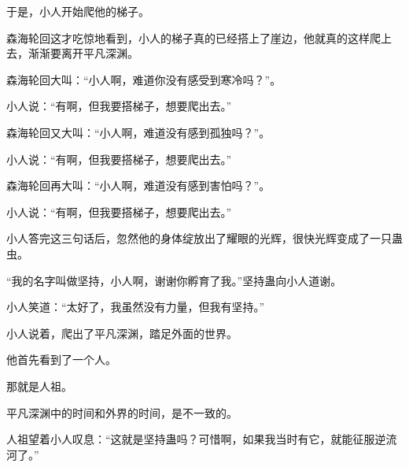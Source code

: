 \begin{this_body}
于是，小人开始爬他的梯子。

森海轮回这才吃惊地看到，小人的梯子真的已经搭上了崖边，他就真的这样爬上去，渐渐要离开平凡深渊。

森海轮回大叫：“小人啊，难道你没有感受到寒冷吗？”。

小人说：“有啊，但我要搭梯子，想要爬出去。”

森海轮回又大叫：“小人啊，难道没有感到孤独吗？”。

小人说：“有啊，但我要搭梯子，想要爬出去。”

森海轮回再大叫：“小人啊，难道没有感到害怕吗？”。

小人说：“有啊，但我要搭梯子，想要爬出去。”

小人答完这三句话后，忽然他的身体绽放出了耀眼的光辉，很快光辉变成了一只蛊虫。

“我的名字叫做坚持，小人啊，谢谢你孵育了我。”坚持蛊向小人道谢。

小人笑道：“太好了，我虽然没有力量，但我有坚持。”

小人说着，爬出了平凡深渊，踏足外面的世界。

他首先看到了一个人。

那就是人祖。

平凡深渊中的时间和外界的时间，是不一致的。

人祖望着小人叹息：“这就是坚持蛊吗？可惜啊，如果我当时有它，就能征服逆流河了。”

\end{this_body}

